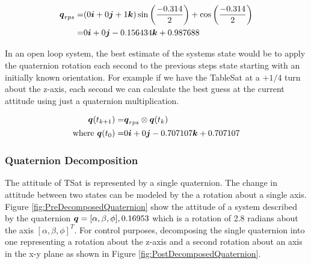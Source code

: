 \begin{equation}
  \begin{aligned}
    \boldsymbol{q}_{rps} = & ( 0\boldsymbol{i} + 0\boldsymbol{j} + 1\boldsymbol{k} ) \sin \left( \frac{-0.314}{2} \right) + \cos \left( \frac{-0.314}{2} \right) \\
    = & 0\boldsymbol{i} +0\boldsymbol{j} -0.156434\boldsymbol{k} + 0.987688
  \end{aligned}
\end{equation}

In an open loop system, the best estimate of the systems state would be to apply the quaternion rotation each second to the previous steps state starting with an initially known orientation.  For example if we have the TableSat at a $+1/4$ turn about the z-axis, each second we can calculate the best guess at the current attitude using just a quaternion multiplication.

\begin{equation}
  \begin{aligned}
    \boldsymbol{q}(t_{k+1}) = & \boldsymbol{q}_{rps} \otimes \boldsymbol{q}(t_{k}) \\
    \text{where } \boldsymbol{q}(t_0) = & 0 \boldsymbol{i} +0 \boldsymbol{j} -0.707107 \boldsymbol{k} +0.707107
  \end{aligned}
  \label{eqn:3rpmQuaternionEquation}
\end{equation}

\subsubsection{Quaternion Decomposition}
\label{subsubsec:QuaternionDecomposition}

The attitude of TSat is represented by a single quaternion.  The change in attitude between two states can be modeled by the a rotation about a single axis.  Figure \ref{fig:PreDecomposedQuaternion} show the attitude of a system described by the quaternion $\boldsymbol{q} = [\alpha, \beta, \phi], 0.16953$ which is a rotation of 2.8 radians about the axis $[\alpha, \beta, \phi]^T$.  For control purposes, decomposing the single quaternion into one representing a rotation about the z-axis and a second rotation about an axis in the x-y plane as shown in Figure \ref{fig:PostDecomposedQuaternion}.

